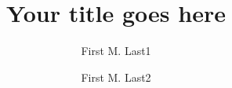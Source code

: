 \documentclass[final,1p,times]{elsarticle}
\begin{document}
\begin{frontmatter}
\begin{Form}
\begin{itemize}
\end{itemize}
\end{Form}

\title{\textbf{Your title goes here}}  %


\author[fml1]{First M. Last1}
\author[fml2]{First M. Last2}


\address[fml1]{Institution1, Mail Stop1, Street Address1, City1, State1, Zip Code1, Country1, phone number1}
\address[fml2]{Institution2, Mail Stop2, Street Address2, City2, State2, Zip Code2, Country2, phone number2}




\end{frontmatter}

%
%



\vspace{0.25in}

%
%

\end{document}
